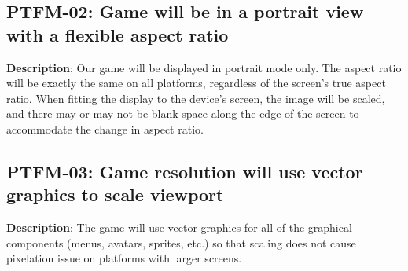 \subsection{PTFM-02: Game will be in a portrait view with a flexible aspect ratio}
\textbf{Description}: Our game will be displayed in portrait mode only. The
aspect ratio will be exactly the same on all platforms, regardless
of the screen\textquoteright{}s true aspect ratio. When fitting the
display to the device\textquoteright{}s screen, the image will be
scaled, and there may or may not be blank space along the edge of
the screen to accommodate the change in aspect ratio.
\subsection{PTFM-03: Game resolution will use vector graphics to scale viewport}
\textbf{Description}: The game will use vector graphics for all of
the graphical components (menus, avatars, sprites, etc.) so that scaling
does not cause pixelation issue on platforms with larger screens. 
